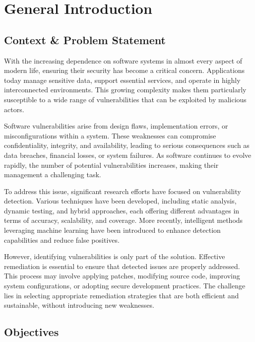 \chapter*{General Introduction}
\label{chap:introduction}



\section*{Context \& Problem Statement}
With the increasing dependence on software systems in almost every aspect of modern life, ensuring their security has become a critical concern. Applications today manage sensitive data, support essential services, and operate in highly interconnected environments. This growing complexity makes them particularly susceptible to a wide range of vulnerabilities that can be exploited by malicious actors.

Software vulnerabilities arise from design flaws, implementation errors, or misconfigurations within a system. These weaknesses can compromise confidentiality, integrity, and availability, leading to serious consequences such as data breaches, financial losses, or system failures. As software continues to evolve rapidly, the number of potential vulnerabilities increases, making their management a challenging task.

To address this issue, significant research efforts have focused on vulnerability detection. Various techniques have been developed, including static analysis, dynamic testing, and hybrid approaches, each offering different advantages in terms of accuracy, scalability, and coverage. More recently, intelligent methods leveraging machine learning have been introduced to enhance detection capabilities and reduce false positives.

However, identifying vulnerabilities is only part of the solution. Effective remediation is essential to ensure that detected issues are properly addressed. This process may involve applying patches, modifying source code, improving system configurations, or adopting secure development practices. The challenge lies in selecting appropriate remediation strategies that are both efficient and sustainable, without introducing new weaknesses.

\section*{Objectives}

